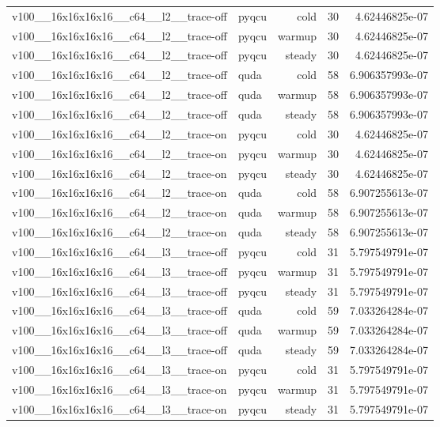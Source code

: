 \begin{table}[htbp]
\begin{tabular}{@{}llrrr@{}}
v100\_\_16x16x16x16\_\_c64\_\_l2\_\_trace-off & pyqcu & cold & 30 & 4.62446825e-07 \\
v100\_\_16x16x16x16\_\_c64\_\_l2\_\_trace-off & pyqcu & warmup & 30 & 4.62446825e-07 \\
v100\_\_16x16x16x16\_\_c64\_\_l2\_\_trace-off & pyqcu & steady & 30 & 4.62446825e-07 \\
v100\_\_16x16x16x16\_\_c64\_\_l2\_\_trace-off & quda & cold & 58 & 6.906357993e-07 \\
v100\_\_16x16x16x16\_\_c64\_\_l2\_\_trace-off & quda & warmup & 58 & 6.906357993e-07 \\
v100\_\_16x16x16x16\_\_c64\_\_l2\_\_trace-off & quda & steady & 58 & 6.906357993e-07 \\
v100\_\_16x16x16x16\_\_c64\_\_l2\_\_trace-on & pyqcu & cold & 30 & 4.62446825e-07 \\
v100\_\_16x16x16x16\_\_c64\_\_l2\_\_trace-on & pyqcu & warmup & 30 & 4.62446825e-07 \\
v100\_\_16x16x16x16\_\_c64\_\_l2\_\_trace-on & pyqcu & steady & 30 & 4.62446825e-07 \\
v100\_\_16x16x16x16\_\_c64\_\_l2\_\_trace-on & quda & cold & 58 & 6.907255613e-07 \\
v100\_\_16x16x16x16\_\_c64\_\_l2\_\_trace-on & quda & warmup & 58 & 6.907255613e-07 \\
v100\_\_16x16x16x16\_\_c64\_\_l2\_\_trace-on & quda & steady & 58 & 6.907255613e-07 \\
v100\_\_16x16x16x16\_\_c64\_\_l3\_\_trace-off & pyqcu & cold & 31 & 5.797549791e-07 \\
v100\_\_16x16x16x16\_\_c64\_\_l3\_\_trace-off & pyqcu & warmup & 31 & 5.797549791e-07 \\
v100\_\_16x16x16x16\_\_c64\_\_l3\_\_trace-off & pyqcu & steady & 31 & 5.797549791e-07 \\
v100\_\_16x16x16x16\_\_c64\_\_l3\_\_trace-off & quda & cold & 59 & 7.033264284e-07 \\
v100\_\_16x16x16x16\_\_c64\_\_l3\_\_trace-off & quda & warmup & 59 & 7.033264284e-07 \\
v100\_\_16x16x16x16\_\_c64\_\_l3\_\_trace-off & quda & steady & 59 & 7.033264284e-07 \\
v100\_\_16x16x16x16\_\_c64\_\_l3\_\_trace-on & pyqcu & cold & 31 & 5.797549791e-07 \\
v100\_\_16x16x16x16\_\_c64\_\_l3\_\_trace-on & pyqcu & warmup & 31 & 5.797549791e-07 \\
v100\_\_16x16x16x16\_\_c64\_\_l3\_\_trace-on & pyqcu & steady & 31 & 5.797549791e-07 \\

\end{tabular}
\end{table}
